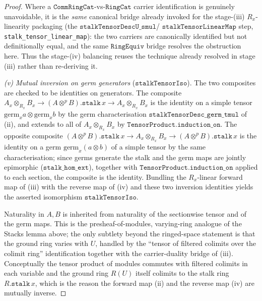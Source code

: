\begin{proof}
  Where a \(\mathtt{CommRingCat}\)-vs-\(\mathtt{RingCat}\) carrier identification is
  genuinely unavoidable, it is the \emph{same} canonical bridge already invoked for the
  stage-(iii) \(R_x\)-linearity packaging (the \(\mathtt{stalkTensorDescU\_smul}\)/%
  \(\mathtt{stalkTensorLinearMap}\) step, \texttt{stalk\_tensor\_linear\_map}): the two
  carriers are canonically identified but not definitionally equal, and the same
  \(\mathtt{RingEquiv}\) bridge resolves the obstruction here. Thus the stage-(iv)
  balancing reuses the technique already resolved in stage (iii) rather than re-deriving
  it.

  \emph{(v) Mutual inversion on germ generators} (\(\mathtt{stalkTensorIso}\)). The two
  composites are checked to be identities on generators. The composite
  \(A_x \otimes_{R_x} B_x \to (A \otimes^{p} B).\mathtt{stalk}\,x \to A_x
  \otimes_{R_x} B_x\) is the identity on a simple tensor \(\mathrm{germ}_x a \otimes
  \mathrm{germ}_x b\) by the germ characterisation \(\mathtt{stalkTensorDesc\_germ\_tmul}\)
  of (ii), and extends to all of \(A_x \otimes_{R_x} B_x\) by
  \(\mathtt{TensorProduct.induction\_on}\). The opposite composite
  \((A \otimes^{p} B).\mathtt{stalk}\,x \to A_x \otimes_{R_x} B_x \to (A \otimes^{p}
  B).\mathtt{stalk}\,x\) is the identity on a germ \(\mathrm{germ}_x(a \otimes b)\) of
  a simple tensor by the same characterisation; since germs generate the stalk and the
  germ maps are jointly epimorphic (\(\mathtt{stalk\_hom\_ext}\)), together with
  \(\mathtt{TensorProduct.induction\_on}\) applied to each section, the composite is the
  identity. Bundling the \(R_x\)-linear forward map of (iii) with the reverse map of
  (iv) and these two inversion identities yields the asserted isomorphism
  \(\mathtt{stalkTensorIso}\).

  Naturality in \(A, B\) is inherited from naturality of the sectionwise tensor and of
  the germ maps. This is the presheaf-of-modules, varying-ring analogue of the Stacks
  lemma above; the only subtlety beyond the ringed-space statement is that the ground
  ring varies with \(U\), handled by the ``tensor of filtered colimits over the colimit
  ring'' identification together with the carrier-duality bridge of (iii). Conceptually
  the tensor product of modules commutes with filtered colimits in each variable and
  the ground ring \(R(U)\) itself colimits to the stalk ring \(R.\mathtt{stalk}\,x\),
  which is the reason the forward map (ii) and the reverse map (iv) are mutually
  inverse.
\end{proof}

